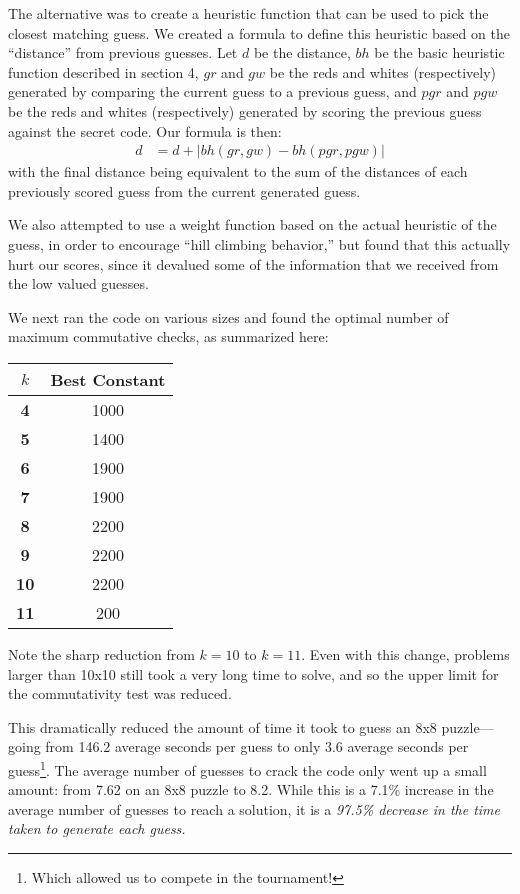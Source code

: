 \documentclass[11pt,twocolumn]{article}
\begin{document}

The alternative was to create a heuristic function that can be used to pick the closest matching guess. We created a formula to define this heuristic based on the ``distance'' from previous guesses. Let $d$ be the distance, $bh$ be the basic heuristic function described in section 4, $gr$ and $gw$ be the reds and whites (respectively) generated by comparing the current guess to a previous guess, and $pgr$ and $pgw$ be the reds and whites (respectively) generated by scoring the previous guess against the secret code. Our formula is then: 
\begin{align*} %
d &= d + | bh(gr, gw)  - bh(pgr, pgw)|
\end{align*}
with the final distance being equivalent to the sum of the distances of each previously scored guess from the current generated guess. 

We also attempted to use a weight function based on the actual heuristic of the guess, in order to encourage ``hill climbing behavior,'' but found that this actually hurt our scores, since it devalued some of the information that we received from the low valued guesses. 

We next ran the code on various sizes and found the optimal number of maximum commutative checks, as summarized here: 

\begin{center}
\begin{tabular}{| c | c |}
\hline
\bf $k$ & \bf Best Constant\\
\hline
\bf 4 & 1000\\
\hline
\bf 5 & 1400\\
\hline
\bf 6 & 1900\\
\hline
\bf 7 & 1900\\
\hline
\bf 8 & 2200\\
\hline
\bf 9 & 2200\\
\hline
\bf 10 & 2200\\
\hline
\bf 11 & 200\\
\hline
\end{tabular}
\end{center}

Note the sharp reduction from $k=10$ to $k=11$. Even with this change, problems larger than 10x10 still took a very long time to solve, and so the upper limit for the commutativity test was reduced.

This dramatically reduced the amount of time it took to guess an 8x8 puzzle---going from 146.2 average seconds per guess to only 3.6 average seconds per guess\footnote{Which allowed us to compete in the tournament!}. The average number of guesses to crack the code only went up a small amount: from 7.62 on an 8x8 puzzle to 8.2. While this is a 7.1\% increase in the average number of guesses to reach a solution, it is a \em 97.5\% decrease \rm in the time taken to generate each guess.
\end{document}
